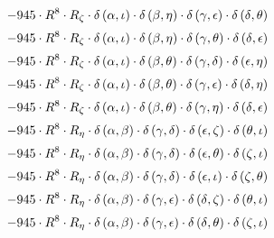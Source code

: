 \begin{subequations}
\begin{gather}
 \\[0.2em] \notag 		 - 945 \cdot R^{8} \cdot R_{\zeta{}} \cdot \delta{}\left(\alpha{}, \iota{}\right) \cdot \delta{}\left(\beta{}, \eta{}\right) \cdot \delta{}\left(\gamma{}, \epsilon{}\right) \cdot \delta{}\left(\delta{}, \theta{}\right) 
 \\[0.2em] \notag 		 - 945 \cdot R^{8} \cdot R_{\zeta{}} \cdot \delta{}\left(\alpha{}, \iota{}\right) \cdot \delta{}\left(\beta{}, \eta{}\right) \cdot \delta{}\left(\gamma{}, \theta{}\right) \cdot \delta{}\left(\delta{}, \epsilon{}\right) 
 \\[0.2em] \notag 		 - 945 \cdot R^{8} \cdot R_{\zeta{}} \cdot \delta{}\left(\alpha{}, \iota{}\right) \cdot \delta{}\left(\beta{}, \theta{}\right) \cdot \delta{}\left(\gamma{}, \delta{}\right) \cdot \delta{}\left(\epsilon{}, \eta{}\right) 
 \\[0.2em] \notag 		 - 945 \cdot R^{8} \cdot R_{\zeta{}} \cdot \delta{}\left(\alpha{}, \iota{}\right) \cdot \delta{}\left(\beta{}, \theta{}\right) \cdot \delta{}\left(\gamma{}, \epsilon{}\right) \cdot \delta{}\left(\delta{}, \eta{}\right) 
 \\[0.2em] \notag 		 - 945 \cdot R^{8} \cdot R_{\zeta{}} \cdot \delta{}\left(\alpha{}, \iota{}\right) \cdot \delta{}\left(\beta{}, \theta{}\right) \cdot \delta{}\left(\gamma{}, \eta{}\right) \cdot \delta{}\left(\delta{}, \epsilon{}\right) 
 \\[0.2em] \notag 		 - 945 \cdot R^{8} \cdot R_{\eta{}} \cdot \delta{}\left(\alpha{}, \beta{}\right) \cdot \delta{}\left(\gamma{}, \delta{}\right) \cdot \delta{}\left(\epsilon{}, \zeta{}\right) \cdot \delta{}\left(\theta{}, \iota{}\right) 
 \\[0.2em] \notag 		 - 945 \cdot R^{8} \cdot R_{\eta{}} \cdot \delta{}\left(\alpha{}, \beta{}\right) \cdot \delta{}\left(\gamma{}, \delta{}\right) \cdot \delta{}\left(\epsilon{}, \theta{}\right) \cdot \delta{}\left(\zeta{}, \iota{}\right) 
 \\[0.2em] \notag 		 - 945 \cdot R^{8} \cdot R_{\eta{}} \cdot \delta{}\left(\alpha{}, \beta{}\right) \cdot \delta{}\left(\gamma{}, \delta{}\right) \cdot \delta{}\left(\epsilon{}, \iota{}\right) \cdot \delta{}\left(\zeta{}, \theta{}\right) 
 \\[0.2em] \notag 		 - 945 \cdot R^{8} \cdot R_{\eta{}} \cdot \delta{}\left(\alpha{}, \beta{}\right) \cdot \delta{}\left(\gamma{}, \epsilon{}\right) \cdot \delta{}\left(\delta{}, \zeta{}\right) \cdot \delta{}\left(\theta{}, \iota{}\right) 
 \\[0.2em] \notag 		 - 945 \cdot R^{8} \cdot R_{\eta{}} \cdot \delta{}\left(\alpha{}, \beta{}\right) \cdot \delta{}\left(\gamma{}, \epsilon{}\right) \cdot \delta{}\left(\delta{}, \theta{}\right) \cdot \delta{}\left(\zeta{}, \iota{}\right) 

\end{gather}
\end{subequations}
